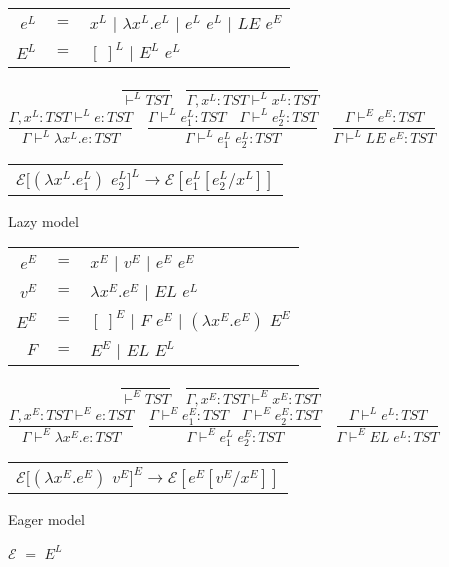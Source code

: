 \documentclass[12pt]{ucthesis}
\begin{document}
\begin{figure}[p]
\centering
\begin{tabular}{rcl}
$e^L$ & $=$ & $x^L$ $|$ $\lambda x^L.e^L$ $|$ $e^L$ $e^L$ $|$ $LE$ $e^E$ \\
$E^L$ & $=$ & $[\;]^L$ $|$ $E^L$ $e^L$
\end{tabular}
\[
\frac{}{\vdash^LTST}
\quad
\frac{}{\Gamma,x^L:TST\vdash^Lx^L:TST}
\]
\[
\frac{\Gamma,x^L:TST\vdash^Le:TST}{\Gamma\vdash^L\lambda x^L.e:TST}
\quad
\frac{\Gamma\vdash^Le^L_1:TST\quad\Gamma\vdash^Le^L_2:TST}{\Gamma\vdash^Le^L_1\;e^L_2:TST}
\quad
\frac{\Gamma\vdash^Ee^E:TST}{\Gamma\vdash^LLE\;e^E:TST}
\]
\begin{tabular}{l}
$\mathscr{E}[(\lambda x^L.e^L_1)$ $e^L_2]^L\rightarrow\mathscr{E}[e^L_1[e^L_2/x^L]]$
\end{tabular}
\caption{Lazy model}
\end{figure}

\begin{figure}[p]
\centering
\begin{tabular}{rcl}
$e^E$ & $=$ & $x^E$ $|$ $v^E$ $|$ $e^E$ $e^E$ \\
$v^E$ & $=$ & $\lambda x^E.e^E$ $|$ $EL$ $e^L$ \\
$E^E$ & $=$ & $[\;]^E$ $|$ $F$ $e^E$ $|$ $(\lambda x^E.e^E)$ $E^E$ \\
$F$ & $=$ & $E^E$ $|$ $EL$ $E^L$
\end{tabular}
\[
\frac{}{\vdash^ETST}
\quad
\frac{}{\Gamma,x^E:TST\vdash^Ex^E:TST}
\]
\[
\frac{\Gamma,x^E:TST\vdash^Ee:TST}{\Gamma\vdash^E\lambda x^E.e:TST}
\quad
\frac{\Gamma\vdash^Ee^E_1:TST\quad\Gamma\vdash^Ee^E_2:TST}{\Gamma\vdash^Ee^L_1\;e^E_2:TST}
\quad
\frac{\Gamma\vdash^Le^L:TST}{\Gamma\vdash^EEL\;e^L:TST}
\]
\begin{tabular}{l}
$\mathscr{E}[(\lambda x^E.e^E)$ $v^E]^E\rightarrow\mathscr{E}[e^E[v^E/x^E]]$
\end{tabular}
\caption{Eager model}
\end{figure}

\begin{figure}[p]
\centering
$\mathscr{E}$ $=$ $E^L$
\end{figure}
\end{document}
